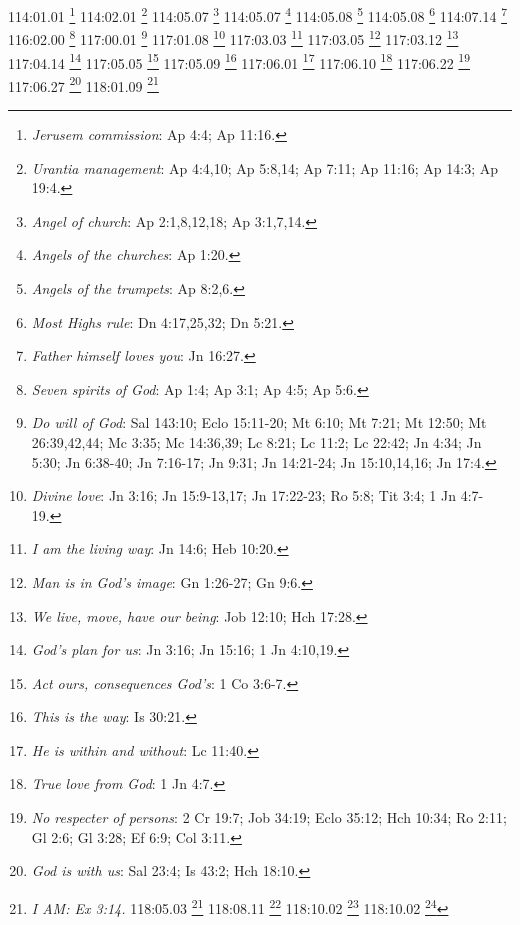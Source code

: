 {{{{{{{{{{{114:01.01 \footnote{\textit{Jerusem commission}: Ap 4:4; Ap 11:16.}
114:02.01 \footnote{\textit{Urantia management}: Ap 4:4,10; Ap 5:8,14; Ap 7:11; Ap 11:16; Ap 14:3; Ap 19:4.}
114:05.07 \footnote{\textit{Angel of church}: Ap 2:1,8,12,18; Ap 3:1,7,14.}
114:05.07 \footnote{\textit{Angels of the churches}: Ap 1:20.}
114:05.08 \footnote{\textit{Angels of the trumpets}: Ap 8:2,6.}
114:05.08 \footnote{\textit{Most Highs rule}: Dn 4:17,25,32; Dn 5:21.}
114:07.14 \footnote{\textit{Father himself loves you}: Jn 16:27.}
116:02.00 \footnote{\textit{Seven spirits of God}: Ap 1:4; Ap 3:1; Ap 4:5; Ap 5:6.}
117:00.01 \footnote{\textit{Do will of God}: Sal 143:10; Eclo 15:11-20; Mt 6:10; Mt 7:21; Mt 12:50; Mt 26:39,42,44; Mc 3:35; Mc 14:36,39; Lc 8:21; Lc 11:2; Lc 22:42; Jn 4:34; Jn 5:30; Jn 6:38-40; Jn 7:16-17; Jn 9:31; Jn 14:21-24; Jn 15:10,14,16; Jn 17:4.}
117:01.08 \footnote{\textit{Divine love}: Jn 3:16; Jn 15:9-13,17; Jn 17:22-23; Ro 5:8; Tit 3:4; 1 Jn 4:7-19.}
117:03.03 \footnote{\textit{I am the living way}: Jn 14:6; Heb 10:20.}
117:03.05 \footnote{\textit{Man is in God's image}: Gn 1:26-27; Gn 9:6.}
117:03.12 \footnote{\textit{We live, move, have our being}: Job 12:10; Hch 17:28.}
117:04.14 \footnote{\textit{God's plan for us}: Jn 3:16; Jn 15:16; 1 Jn 4:10,19.}
117:05.05 \footnote{\textit{Act ours, consequences God's}: 1 Co 3:6-7.}
117:05.09 \footnote{\textit{This is the way}: Is 30:21.}
117:06.01 \footnote{\textit{He is within and without}: Lc 11:40.}
117:06.10 \footnote{\textit{True love from God}: 1 Jn 4:7.}
117:06.22 \footnote{\textit{No respecter of persons}: 2 Cr 19:7; Job 34:19; Eclo 35:12; Hch 10:34; Ro 2:11; Gl 2:6; Gl 3:28; Ef 6:9; Col 3:11.}
117:06.27 \footnote{\textit{God is with us}: Sal 23:4; Is 43:2; Hch 18:10.}
118:01.09 \footnote{\textit{I AM: Ex 3:14.}
118:05.03 \footnote{\textit{God loves us first}: 1 Jn 4:10,19.}
118:08.11 \footnote{\textit{My will that your will be done}: Sal 143:10; Eclo 15:11-20; Mt 6:10; Mt 7:21; Mt 12:50; Mt 26:39,42,44; Mc 3:35; Mc 14:36,39; Lc 8:21; Lc 11:2; Lc 22:42; Jn 4:34; Jn 5:30; Jn 6:38-40; Jn 7:16-17; Jn 9:31; Jn 14:21-24; Jn 15:10,14; Jn 17:4.}
118:10.02 \footnote{\textit{The Trinity}: Mt 28:19; Hch 2:32-33; 2 Co 13:14; 1 Jn 5:7.}
118:10.02 \footnote{\textit{The Trinity (Paul's early view): 1 Co 12:4-6.}
118:10.05 \footnote{\textit{God loves creatures as children}: Jn 3:16; Jn 15:9-13; Jn 17:22-23; Ro 5:8; Tit 3:4; 1 Jn 4:9-11,19.}
118:10.17 \footnote{\textit{Kingdom in hearts}: Lc 17:21.}
118:10.18 \footnote{\textit{All things work for good}: Ro 8:28.}
119:01.05 \footnote{\textit{Order of Melchizedek}: Heb 5:10; Heb 6:20; Heb 7:17.}
}}}}}}}}}}}}}
